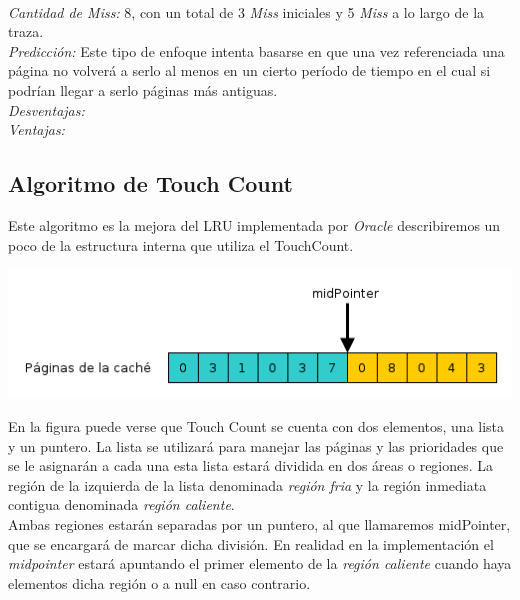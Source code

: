 \documentclass[11pt, a4paper, spanish]{article}
\begin{document}
\\
\emph{Cantidad de Miss:} 8, con un total de 3 \textit{Miss} iniciales y 5 \textit{Miss} a lo largo de la traza. \\
\emph{Predicci\'on:} Este tipo de enfoque intenta basarse en que una vez referenciada una p\'agina no volver\'a a serlo al menos en un cierto per\'iodo
de tiempo en el cual si podr\'ian llegar a serlo p\'aginas m\'as antiguas.\\
\emph{Desventajas:} \\
\emph{Ventajas:} \\

\newpage
\subsection{Algoritmo de Touch Count}

Este algoritmo es la mejora del LRU implementada por \textit{Oracle} describiremos un poco de la estructura interna que utiliza el TouchCount.


\begin{center}
		\includegraphics[scale=0.65]{diagramas/TouchCountAlgorithm1.png}\\
\end{center}

En la figura puede verse que Touch Count se cuenta con dos elementos, una lista y un puntero. La lista se utilizar\'a para manejar las p\'aginas y las prioridades que se le asignar\'an a cada
una esta lista estar\'a dividida en dos \'areas o regiones. La regi\'on de la izquierda de la lista denominada \textit{regi\'on fria} y la regi\'on inmediata
contigua denominada \textit{regi\'on caliente}.\\

Ambas regiones estar\'an separadas por un puntero, al que llamaremos midPointer, que se encargar\'a de marcar dicha divisi\'on. 
En realidad en la implementaci\'on el \textit{midpointer} estar\'a apuntando el primer elemento de la \textit{regi\'on caliente} cuando haya
elementos dicha regi\'on o a null en caso contrario.\\
\end{document}
